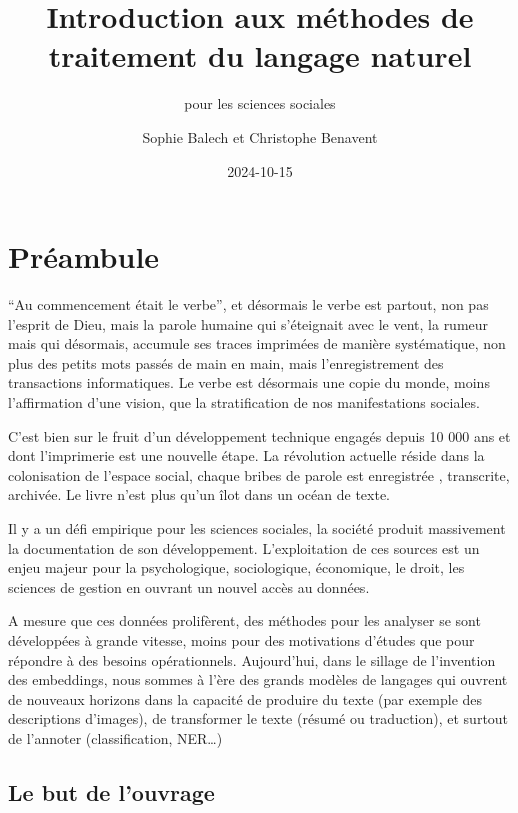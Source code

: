 \documentclass[
  letterpaper,
  DIV=11,
  numbers=noendperiod]{scrreprt}
\title{Introduction aux méthodes de traitement du langage naturel}
\subtitle{pour les sciences sociales}
\author{Sophie Balech et Christophe Benavent}
\date{2024-10-15}
\renewcommand*\contentsname{Table of contents}
\newcommand\contentsname{Table of contents}
\begin{document}
\maketitle

\renewcommand*\contentsname{Table of contents}
{
\hypersetup{linkcolor=}
\setcounter{tocdepth}{2}
\tableofcontents
}


\chapter*{Préambule}\label{pruxe9ambule}


``Au commencement était le verbe'', et désormais le verbe est partout,
non pas l'esprit de Dieu, mais la parole humaine qui s'éteignait avec le
vent, la rumeur mais qui désormais, accumule ses traces imprimées de
manière systématique, non plus des petits mots passés de main en main,
mais l'enregistrement des transactions informatiques. Le verbe est
désormais une copie du monde, moins l'affirmation d'une vision, que la
stratification de nos manifestations sociales.

C'est bien sur le fruit d'un développement technique engagés depuis 10
000 ans et dont l'imprimerie est une nouvelle étape. La révolution
actuelle réside dans la colonisation de l'espace social, chaque bribes
de parole est enregistrée , transcrite, archivée. Le livre n'est plus
qu'un îlot dans un océan de texte.

Il y a un défi empirique pour les sciences sociales, la société produit
massivement la documentation de son développement. L'exploitation de ces
sources est un enjeu majeur pour la psychologique, sociologique,
économique, le droit, les sciences de gestion en ouvrant un nouvel accès
au données.

A mesure que ces données prolifèrent, des méthodes pour les analyser se
sont développées à grande vitesse, moins pour des motivations d'études
que pour répondre à des besoins opérationnels. Aujourd'hui, dans le
sillage de l'invention des embeddings, nous sommes à l'ère des grands
modèles de langages qui ouvrent de nouveaux horizons dans la capacité de
produire du texte (par exemple des descriptions d'images), de
transformer le texte (résumé ou traduction), et surtout de l'annoter
(classification, NER\ldots)

\section*{Le but de l'ouvrage}\label{le-but-de-louvrage}
\end{document}
